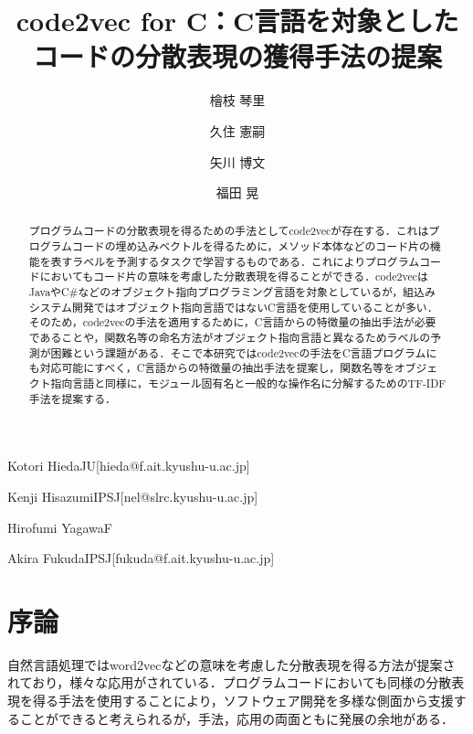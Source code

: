 \documentclass[submit,techrep,noauthor]{ipsj}
\begin{document}
\title{code2vec for C：C言語を対象としたコードの分散表現の獲得手法の提案}



\author{檜枝 琴里}{Kotori Hieda}{JU}[hieda@f.ait.kyushu-u.ac.jp]
\author{久住 憲嗣}{Kenji Hisazumi}{IPSJ}[nel@slrc.kyushu-u.ac.jp]
\author{矢川 博文}{Hirofumi Yagawa}{F}
\author{福田 晃}{Akira Fukuda}{IPSJ}[fukuda@f.ait.kyushu-u.ac.jp]

\begin{abstract}
プログラムコードの分散表現を得るための手法としてcode2vecが存在する．これはプログラムコードの埋め込みベクトルを得るために，メソッド本体などのコード片の機能を表すラベルを予測するタスクで学習するものである．これによりプログラムコードにおいてもコード片の意味を考慮した分散表現を得ることができる．code2vecはJavaやC\#などのオブジェクト指向プログラミング言語を対象としているが，組込みシステム開発ではオブジェクト指向言語ではないC言語を使用していることが多い．そのため，code2vecの手法を適用するために，C言語からの特徴量の抽出手法が必要であることや，関数名等の命名方法がオブジェクト指向言語と異なるためラベルの予測が困難という課題がある．そこで本研究ではcode2vecの手法をC言語プログラムにも対応可能にすべく，C言語からの特徴量の抽出手法を提案し，関数名等をオブジェクト指向言語と同様に，モジュール固有名と一般的な操作名に分解するためのTF-IDF手法を提案する．
\end{abstract}



\maketitle

\section{序論}
自然言語処理ではword2vec\cite{rong2014word2vec}などの意味を考慮した分散表現を得る方法が提案されており，様々な応用がされている．プログラムコードにおいても同様の分散表現を得る手法を使用することにより，ソフトウェア開発を多様な側面から支援することができると考えられるが，手法，応用の両面ともに発展の余地がある．
\end{document}
